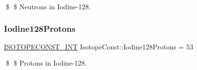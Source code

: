 \$ \$ Neutrons in Iodine-\/128. \mbox{\label{group___isotope_const-_iodine-_i128_ga03545c2200860e8083a9c6d8e8bc28c4}} 
\subsubsection{\texorpdfstring{Iodine128\+Protons}{Iodine128Protons}}
{\footnotesize\ttfamily \mbox{\hyperlink{group___isotope_const-_macros_ga5f18360b3e99483a35c32d789e62621c}{I\+S\+O\+T\+O\+P\+E\+C\+O\+N\+S\+T\+\_\+\+I\+NT}} Isotope\+Const\+::\+Iodine128\+Protons = 53}

\$ \$ Protons in Iodine-\/128. 